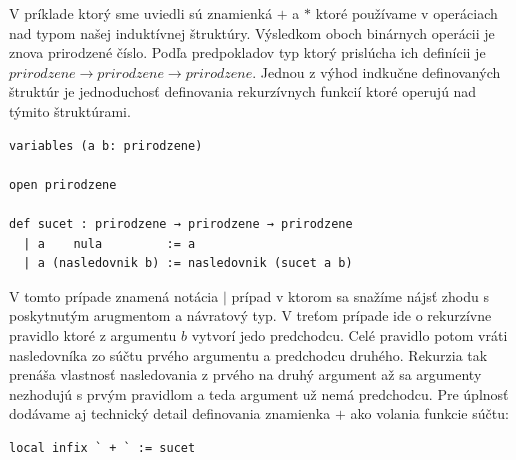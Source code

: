 \documentclass[a4paper,10pt,oneside]{report}%
\begin{document}
    V príklade ktorý sme uviedli sú znamienká $+$ a $*$ ktoré používame
v operáciach nad typom našej induktívnej štruktúry.
    Výsledkom oboch binárnych operácii je znova prirodzené číslo.
    Podľa predpokladov typ ktorý prislúcha ich definícii je
$prirodzene \to prirodzene \to prirodzene$.
    Jednou z výhod indkučne definovaných štruktúr je jednoduchosť definovania
rekurzívnych funkcií ktoré operujú nad týmito štruktúrami.
\begin{lstlisting}
variables (a b: prirodzene)

open prirodzene

def sucet : prirodzene → prirodzene → prirodzene
  | a    nula         := a
  | a (nasledovnik b) := nasledovnik (sucet a b)
\end{lstlisting}
    V tomto prípade znamená notácia $|$ prípad v ktorom sa snažíme nájsť zhodu
s poskytnutým arugmentom a návratový typ.
    V treťom prípade ide o rekurzívne pravidlo ktoré z argumentu $b$ vytvorí jedo
predchodcu.
    Celé pravidlo potom vráti nasledovníka zo súčtu prvého argumentu a predchodcu
druhého.
    Rekurzia tak prenáša vlastnosť nasledovania z prvého na druhý argument až
sa argumenty nezhodujú s prvým pravidlom a teda argument už nemá predchodcu.
    Pre úplnosť dodávame aj technický detail definovania znamienka $+$ ako volania
funkcie súčtu:
\begin{lstlisting}
local infix ` + ` := sucet
\end{lstlisting}
\end{document}

